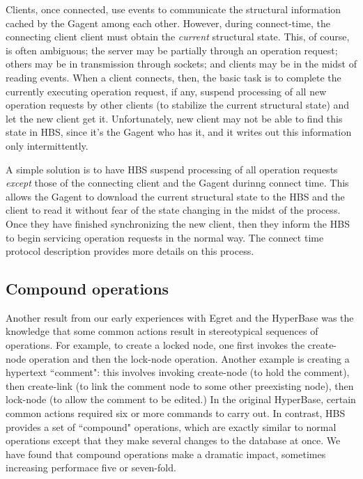 Clients, once connected, use events to communicate the structural
information cached by the Gagent among each other.  However, during
connect-time, the connecting client client must obtain the {\em current} structural state.
This, of course, is often ambiguous; the server may be partially
through an operation request; others may be in transmission through sockets;
and clients may be in the midst of reading events. When a client connects, 
then, the basic task is to complete the currently executing operation request,
if any, suspend processing of all new operation requests by other clients (to stabilize
the current structural state) and let the new client get it.  Unfortunately, new
client may not be able to find this state in HBS, since it's the Gagent who has
it, and it writes out this information only intermittently.

A simple solution is to have HBS suspend processing of all operation requests 
{\em except} those of the connecting client and the Gagent durinng connect time.
This allows the Gagent to download the current structural state to the HBS and 
the client to read it without fear of the state changing in the midst of the 
process.  Once they have finished synchronizing the new client, then they inform
the HBS to begin servicing operation requests in the normal way. The connect
time protocol description provides more details on this process.

\subsection{Compound operations}  

Another result from our early experiences with Egret and the HyperBase was
the knowledge that some common actions result in stereotypical sequences of
operations.  For example, to create a locked node, one first invokes the
create-node operation and then the lock-node operation.  Another example is
creating a hypertext ``comment": this involves invoking create-node (to
hold the comment), then create-link (to link the comment node to some other
preexisting node), then lock-node (to allow the comment to be edited.)  In
the original HyperBase, certain common actions required six or more
commands to carry out.  In contrast, HBS provides a set of ``compound"
operations, which are exactly similar to normal operations except that they
make several changes to the database at once.  We have found that compound
operations make a dramatic impact, sometimes increasing performace five or
seven-fold.  


